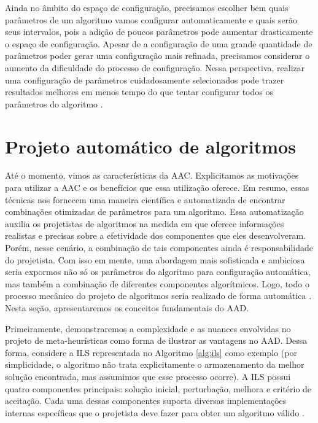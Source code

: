 Ainda no âmbito do espaço de configuração, precisamos escolher bem quais parâmetros de um algoritmo vamos configurar automaticamente e quais serão seus intervalos, pois a adição de poucos parâmetros pode aumentar drasticamente o espaço de configuração. Apesar de a configuração de uma grande quantidade de parâmetros poder gerar uma configuração mais refinada, precisamos considerar o aumento da dificuldade do processo de configuração. Nessa perspectiva, realizar uma configuração de parâmetros cuidadosamente selecionados pode trazer resultados melhores em menos tempo do que tentar configurar todos os parâmetros do algoritmo \citep{eggensperger2019pitfalls}.

\section{Projeto automático de algoritmos}

Até o momento, vimos as características da \ac{AAC}. Explicitamos as motivações para utilizar a \ac{AAC} e os benefícios que essa utilização oferece. Em resumo, essas técnicas nos fornecem uma maneira científica e automatizada de encontrar combinações otimizadas de parâmetros para um algoritmo. Essa automatização auxilia os projetistas de algoritmos na medida em que oferece informações realistas e precisas sobre a efetividade dos componentes que eles desenvolveram. Porém, nesse cenário, a combinação de tais componentes ainda é responsabilidade do projetista. Com isso em mente, uma abordagem mais sofisticada e ambiciosa seria expormos não só os parâmetros do algoritmo para configuração automática, mas também a combinação de diferentes componentes algorítmicos. Logo, todo o processo mecânico do projeto de algoritmos seria realizado de forma automática \citep{stutzle2018automated}. Nesta seção, apresentaremos os conceitos fundamentais do \ac{AAD}.

Primeiramente, demonstraremos a complexidade e as nuances envolvidas no projeto de meta-heurísticas como forma de ilustrar as vantagens no \ac{AAD}. Dessa forma, considere a \ac{ILS} representada no Algoritmo \ref{alg:ils} como exemplo (por simplicidade, o algoritmo não trata explicitamente o armazenamento da melhor solução encontrada, mas assumimos que esse processo ocorre). A \ac{ILS} possui quatro componentes principais: solução inicial, perturbação, melhora e critério de aceitação. Cada uma dessas componentes suporta diversas implementações internas específicas que o projetista deve fazer para obter um algoritmo válido \citep{lourencco2018iterated}. 

